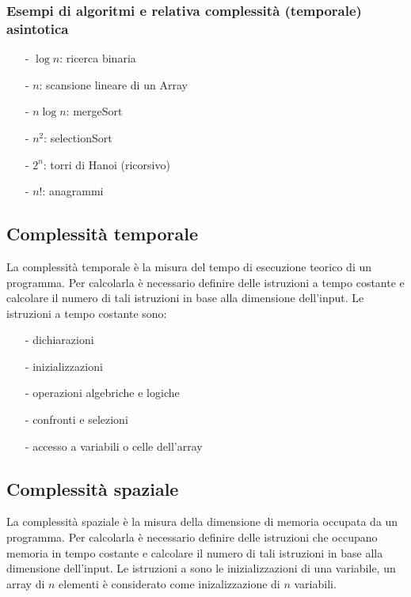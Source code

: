 \documentclass[a4paper]{article}
\begin{document}
\subsubsection*{Esempi di algoritmi e relativa complessità (temporale) asintotica}
\begin{itemize} [topsep=3pt, itemsep=0pt]
	\item[-] \(\log n\): ricerca binaria
	\item[-] \(n\): scansione lineare di un Array
	\item[-] \(n \log n\): mergeSort
	\item[-] \(n^2\): selectionSort
	\item[-] \(2^n\): torri di Hanoi (ricorsivo)
	\item[-] \(n!\): anagrammi
\end{itemize}

\subsection{Complessità temporale}
La complessità temporale è la misura del tempo di esecuzione teorico di un programma. Per calcolarla è necessario definire delle
istruzioni a tempo costante e calcolare il numero di tali istruzioni in base alla dimensione dell'input.
Le istruzioni a tempo costante sono:
\begin{itemize} [topsep=3pt, itemsep=0pt]
	\item[-] dichiarazioni
	\item[-] inizializzazioni
	\item[-] operazioni algebriche e logiche
	\item[-] confronti e selezioni
	\item[-] accesso a variabili o celle dell'array
\end{itemize}

\subsection{Complessità spaziale}
La complessità spaziale è la misura della dimensione di memoria occupata da un programma. Per calcolarla è necessario definire
delle istruzioni che occupano memoria in tempo costante e calcolare il numero di tali istruzioni in base alla dimensione dell'input.
Le istruzioni a  sono le inizializzazioni di una variabile, un array di \(n\) elementi è considerato come
inizalizzazione di \(n\) variabili.

\newpage
\end{document}
